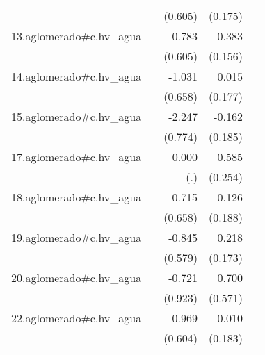 {\begin{longtable}{l*{4}{D{.}{.}{-1}}}
            &                     &     (0.605)         &     (0.175)         &                     \\
\addlinespace
13.aglomerado#c.hv\_agua&                     &      -0.783         &       0.383\sym{*}  &                     \\
            &                     &     (0.605)         &     (0.156)         &                     \\
\addlinespace
14.aglomerado#c.hv\_agua&                     &      -1.031         &       0.015         &                     \\
            &                     &     (0.658)         &     (0.177)         &                     \\
\addlinespace
15.aglomerado#c.hv\_agua&                     &      -2.247\sym{**} &      -0.162         &                     \\
            &                     &     (0.774)         &     (0.185)         &                     \\
\addlinespace
17.aglomerado#c.hv\_agua&                     &       0.000         &       0.585\sym{*}  &                     \\
            &                     &         (.)         &     (0.254)         &                     \\
\addlinespace
18.aglomerado#c.hv\_agua&                     &      -0.715         &       0.126         &                     \\
            &                     &     (0.658)         &     (0.188)         &                     \\
\addlinespace
19.aglomerado#c.hv\_agua&                     &      -0.845         &       0.218         &                     \\
            &                     &     (0.579)         &     (0.173)         &                     \\
\addlinespace
20.aglomerado#c.hv\_agua&                     &      -0.721         &       0.700         &                     \\
            &                     &     (0.923)         &     (0.571)         &                     \\
\addlinespace
22.aglomerado#c.hv\_agua&                     &      -0.969         &      -0.010         &                     \\
            &                     &     (0.604)         &     (0.183)         &                     \\

\end{longtable}}
